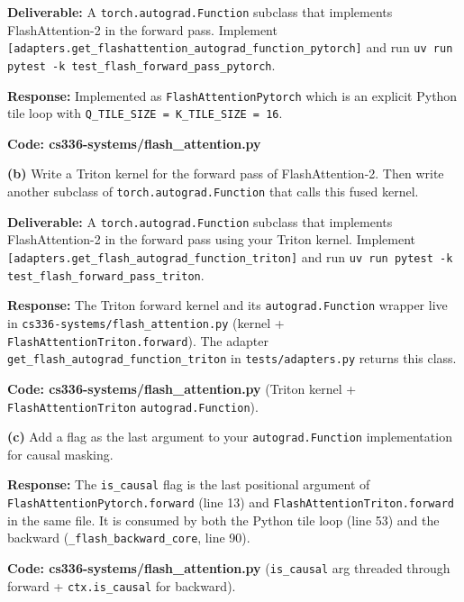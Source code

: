 \documentclass[11pt]{article}
\begin{document}
\textbf{Deliverable:} A \texttt{torch.autograd.Function} subclass that implements FlashAttention-2 in the forward pass. Implement \texttt{[adapters.get\_flashattention\_autograd\_function\_pytorch]} and run \texttt{uv run pytest -k test\_flash\_forward\_pass\_pytorch}.

\vspace{0.25cm}
\textbf{Response:} Implemented as \texttt{FlashAttentionPytorch} which is an explicit Python tile loop with \verb|Q_TILE_SIZE = K_TILE_SIZE = 16|.

\textbf{Code: cs336-systems/flash\_attention.py}

\vspace{0.25cm}
\textbf{(b)} Write a Triton kernel for the forward pass of FlashAttention-2. Then write another subclass of \texttt{torch.autograd.Function} that calls this fused kernel.

\textbf{Deliverable:} A \texttt{torch.autograd.Function} subclass that implements FlashAttention-2 in the forward pass using your Triton kernel. Implement \texttt{[adapters.get\_flash\_autograd\_function\_triton]} and run \texttt{uv run pytest -k test\_flash\_forward\_pass\_triton}.

\vspace{0.25cm}
\textbf{Response:} The Triton forward kernel and its \texttt{autograd.Function} wrapper live in \verb|cs336-systems/flash_attention.py| (kernel + \texttt{FlashAttentionTriton.forward}). The adapter \verb|get_flash_autograd_function_triton| in \verb|tests/adapters.py| returns this class.

\textbf{Code: cs336-systems/flash\_attention.py} (Triton kernel + \texttt{FlashAttentionTriton} \texttt{autograd.Function}).

\vspace{0.25cm}
\textbf{(c)} Add a flag as the last argument to your \texttt{autograd.Function} implementation for causal masking.

\vspace{0.25cm}
\textbf{Response:} The \verb|is_causal| flag is the last positional argument of \texttt{FlashAttentionPytorch.forward} (line 13) and \texttt{FlashAttentionTriton.forward} in the same file. It is consumed by both the Python tile loop (line 53) and the backward (\verb|_flash_backward_core|, line 90).

\textbf{Code: cs336-systems/flash\_attention.py} (\texttt{is\_causal} arg threaded through forward + \texttt{ctx.is\_causal} for backward).

\end{document}
